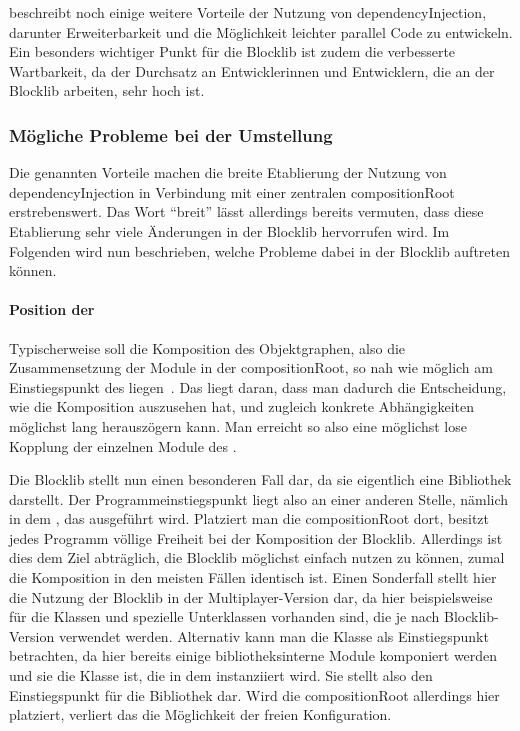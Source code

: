 \textcite[S.~15~\psqq]{Seemann2012} beschreibt noch einige weitere Vorteile der Nutzung von \gls{dependencyInjection}, darunter Erweiterbarkeit und die Möglichkeit leichter parallel Code zu entwickeln. Ein besonders wichtiger Punkt für die Blocklib ist zudem die verbesserte Wartbarkeit, da der Durchsatz an Entwicklerinnen und Entwicklern, die an der Blocklib arbeiten, sehr hoch ist.

\subsubsection{Mögliche Probleme bei der Umstellung}
Die genannten Vorteile machen die breite Etablierung der Nutzung von \gls{dependencyInjection} in Verbindung mit einer zentralen \gls{compositionRoot} erstrebenswert. Das Wort \enquote{breit} lässt allerdings bereits vermuten, dass diese Etablierung sehr viele Änderungen in der Blocklib hervorrufen wird. Im Folgenden wird nun beschrieben, welche Probleme dabei in der Blocklib auftreten können.

\paragraph{Position der }
Typischerweise soll die Komposition des Objektgraphen, also die Zusammensetzung der Module in der \gls{compositionRoot}, so nah wie möglich am Einstiegspunkt des  liegen~\cites[S.~232~\psqq]{Martin17}[S.~76~\psq]{Seemann2012}. Das liegt daran, dass man dadurch die Entscheidung, wie die Komposition auszusehen hat, und zugleich konkrete Abhängigkeiten möglichst lang herauszögern kann. Man erreicht so also eine möglichst lose Kopplung der einzelnen Module des .

Die Blocklib stellt nun einen besonderen Fall dar, da sie eigentlich eine Bibliothek darstellt. Der Programmeinstiegspunkt liegt also an einer anderen Stelle, nämlich in dem \classBlockLibProgram{}, das ausgeführt wird. Platziert man die \gls{compositionRoot} dort, besitzt jedes \gls{Programm} völlige Freiheit bei der Komposition der Blocklib. Allerdings ist dies dem Ziel abträglich, die Blocklib möglichst einfach nutzen zu können, zumal die Komposition in den meisten Fällen identisch ist. Einen Sonderfall stellt hier die Nutzung der Blocklib in der Multiplayer-Version dar, da hier beispielsweise für die Klassen \classWorldInteraction{} und \classContext{} spezielle Unterklassen vorhanden sind, die je nach Blocklib-Version verwendet werden. Alternativ kann man die Klasse \classGame{} als Einstiegspunkt betrachten, da hier bereits einige bibliotheksinterne Module komponiert werden und sie die Klasse ist, die in dem \classBlockLibProgram{} instanziiert wird. Sie stellt also den Einstiegspunkt für die Bibliothek dar. Wird die \gls{compositionRoot} allerdings hier platziert, verliert das \classBlockLibProgram{} die Möglichkeit der freien Konfiguration.

